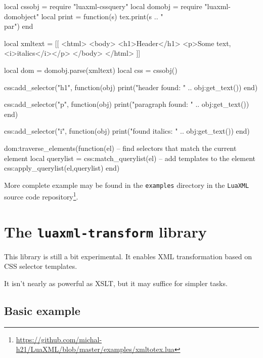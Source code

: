 \documentclass{ltxdoc}
\begin{document}
\begin{framed}
  \begin{luacode*}
local cssobj = require "luaxml-cssquery"
local domobj = require "luaxml-domobject"
local print = function(s) tex.print(s .. "\\par") end

local xmltext = [[
<html>
<body>
<h1>Header</h1>
<p>Some text, <i>italics</i></p>
</body>
</html>
]]

local dom = domobj.parse(xmltext)
local css = cssobj()

css:add_selector("h1", function(obj)
  print("header found: "  .. obj:get_text())
end)

css:add_selector("p", function(obj)
  print("paragraph found: " .. obj:get_text())
end)

css:add_selector("i", function(obj)
  print("found italics: " .. obj:get_text())
end)

dom:traverse_elements(function(el)
  -- find selectors that match the current element
  local querylist = css:match_querylist(el)
  -- add templates to the element
  css:apply_querylist(el,querylist)
end)
  \end{luacode*}
\end{framed}

More complete example may be found in the \texttt{examples} directory in the
\texttt{LuaXML} source code
repository\footnote{\url{https://github.com/michal-h21/LuaXML/blob/master/examples/xmltotex.lua}}.

\section{The \texttt{luaxml-transform} library}

This library is still a bit experimental. It enables XML transformation based
on CSS selector templates. 

It isn't nearly as powerful as XSLT, but it may suffice for simpler tasks.

\subsection{Basic example}
\end{document}
